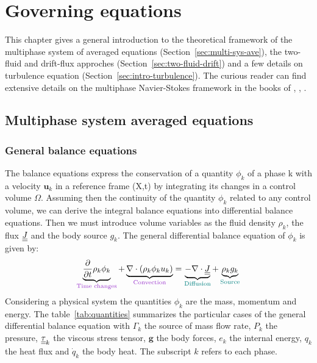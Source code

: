 \chapter{Governing equations}

This chapter gives a general introduction to the theoretical framework of the multiphase system of averaged equations (Section~\ref{sec:multi-sys-ave}), the two-fluid and drift-flux approches (Section~\ref{sec:two-fluid-drift}) and a few details on turbulence equation (Section~\ref{sec:intro-turbulence}). The curious reader can find extensive details on the multiphase Navier-Stokes framework in the books of \cite{LivreIH}, \cite{Morel2015}, \cite{LivreDrewPassman}. 

\section{Multiphase system averaged equations\label{sec:multi-sys-ave}}

\subsection{General balance equations}

The balance equations express the conservation of a quantity $\phi_k$ of a phase k with a velocity $\mathbf{u}_k$ in a reference frame (X,t) by integrating its changes in a control volume $\Omega$. Assuming then the continuity of the quantity $\phi_k$ related to any control volume, we can derive the integral balance equations into differential balance equations. Then we must introduce volume variables as the fluid density $\rho_k$, the flux $\underline{\underline{J}}$ and the body source $g_k$. The general differential balance equation of $\phi_k$ is given by: 
\begin{equation}\label{base:everything}
    \underbrace{\frac{\partial}{\partial t}\rho_k\phi_k}_{\color{mydarkorchid}\text{Time changes}}+\underbrace{\nabla\cdot\parent{\rho_k\phi_ku_k}}_{\color{mydarkorchid} \text{Convection}}=\underbrace{-\nabla\cdot\ull{J}}_{\color{myteal}\text{Diffusion}}+\underbrace{\rho_k g_k}_{\color{myteal}\text{Source}}
\end{equation}
Considering a physical system the quantities $\phi_k$ are the mass, momentum and energy. The table~\ref{tab:quantities} summarizes the particular cases of the general differential balance equation with $\Gamma_k$ the source of mass flow rate, $P_k$ the pressure, $\underline{\underline{\tau}}_k$ the viscous stress tensor, $\mathbf{g}$ the body forces, $e_k$ the internal energy, $q_k$ the heat flux and $\dot{q}_k$ the body heat. The subscript $k$ refers to each phase.



